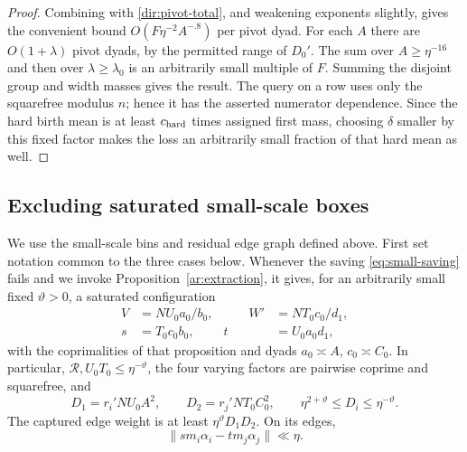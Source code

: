 \begin{proof}
Combining with \eqref{dir:pivot-total}, and weakening exponents
slightly, gives the convenient bound
$O(F\eta^{-2}A^{-.8})$ per pivot dyad. For each $A$ there are
$O(1+\lambda)$ pivot dyads, by the permitted range of $D_0'$.
The sum over $A\ge\eta^{-16}$ and then over
$\lambda\ge\lambda_0$ is an arbitrarily small multiple of $F$.
Summing the disjoint group and width masses gives the result.
The query on a row uses only the squarefree modulus $n$; hence it
has the asserted numerator dependence.
Since the hard birth mean is at least $c_{\rm hard}$ times assigned
first mass, choosing $\delta$ smaller by this fixed factor makes the
loss an arbitrarily small fraction of that hard mean as well.
\end{proof}

\subsection{Excluding saturated small-scale boxes}

We use the small-scale bins and residual edge graph defined above.
First set notation common to the three cases below. Whenever the
saving \eqref{eq:small-saving} fails and we invoke
Proposition~\ref{ar:extraction}, it gives, for an arbitrarily small
fixed $\vartheta>0$, a saturated configuration
\begin{equation}\label{dir:saturated-form}
 \begin{aligned}
 V&=NU_0a_0/b_0,&\qquad
 W'&=NT_0c_0/d_1,\\
 s&=T_0c_0b_0,&
 t&=U_0a_0d_1,
 \end{aligned}
\end{equation}
with the coprimalities of that proposition and dyads
$a_0\asymp A$, $c_0\asymp C_0$. In particular,
$\mathcal R,U_0T_0\le\eta^{-\vartheta}$,
the four varying factors are pairwise coprime and squarefree, and
\[
 D_1=r_i'NU_0A^2,\qquad D_2=r_j'NT_0C_0^2,
 \qquad
 \eta^{2+\vartheta}\le D_i\le\eta^{-\vartheta}.
\]
The captured edge weight is at least
$\eta^\vartheta D_1D_2$. On its edges,
\[
 \|s m_i\alpha_i-t m_j\alpha_j\|\ll\eta.
\]

